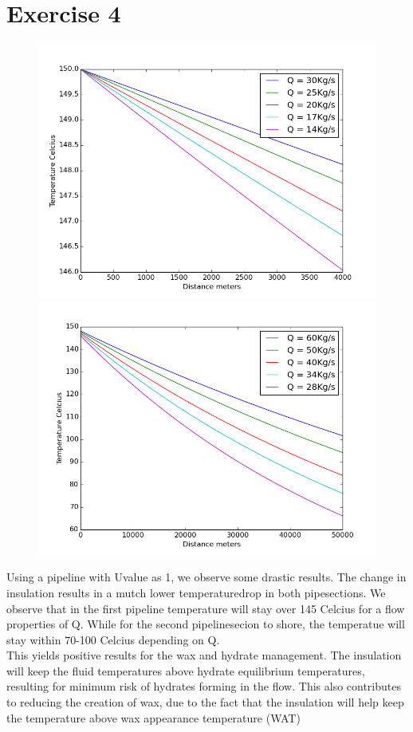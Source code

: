 \documentclass[a4paper,norsk]{article}
\begin{document}
\section*{Exercise 4}
\begin{figure}[h!]  
  \centering
  \includegraphics[scale=0.4]{TASK4wellhead.png}
  \includegraphics[scale=0.4]{TASK4shore.png}
\end{figure}
Using a pipeline with Uvalue as 1, we observe some drastic results. The change in insulation results in a mutch lower temperaturedrop in both pipesections. We observe that in the first pipeline temperature will stay over 145 Celcius for a flow properties of Q. While for the second pipelinesecion to shore, the temperatue will stay within 70-100 Celcius depending on Q. \\
This yields positive results for the wax and hydrate management. The insulation will keep the fluid temperatures above hydrate equilibrium temperatures, resulting for minimum risk of hydrates forming in the flow. This also contributes to reducing the creation of wax, due to the fact that the insulation will help keep the temperature above wax appearance temperature (WAT)
\end{document}
